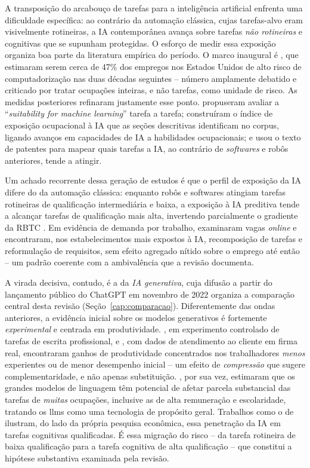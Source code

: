 A transposição do arcabouço de tarefas para a inteligência artificial enfrenta uma dificuldade específica: ao contrário da automação clássica, cujas tarefas-alvo eram visivelmente rotineiras, a IA contemporânea avança sobre tarefas \emph{não rotineiras} e cognitivas que se supunham protegidas. O esforço de medir essa exposição organiza boa parte da literatura empírica do período. O marco inaugural é \textcite{frey2017}, que estimaram serem cerca de 47\% dos empregos nos Estados Unidos de alto risco de computadorização nas duas décadas seguintes -- número amplamente debatido e criticado por tratar ocupações inteiras, e não tarefas, como unidade de risco. As medidas posteriores refinaram justamente esse ponto. \textcite{brynjolfssonMitchellRock2018} propuseram avaliar a ``\textit{suitability for machine learning}'' tarefa a tarefa; \textcite{felten2018, felten2021} construíram o índice de exposição ocupacional à IA que as seções descritivas identificam no corpus, ligando avanços em capacidades de IA a habilidades ocupacionais; e \textcite{webb2020} usou o texto de patentes para mapear quais tarefas a IA, ao contrário de \emph{softwares} e robôs anteriores, tende a atingir.

Um achado recorrente dessa geração de estudos é que o perfil de exposição da IA difere do da automação clássica: enquanto robôs e softwares atingiam tarefas rotineiras de qualificação intermediária e baixa, a exposição à IA preditiva tende a alcançar tarefas de qualificação mais alta, invertendo parcialmente o gradiente da RBTC \parencite{webb2020, felten2021}. Em evidência de demanda por trabalho, \textcite{acemogluVacancies2022} examinaram vagas \textit{online} e encontraram, nos estabelecimentos mais expostos à IA, recomposição de tarefas e reformulação de requisitos, sem efeito agregado nítido sobre o emprego até então -- um padrão coerente com a ambivalência que a revisão documenta.

A virada decisiva, contudo, é a da \emph{IA generativa}, cuja difusão a partir do lançamento público do ChatGPT em novembro de 2022 organiza a comparação central desta revisão (Seção~\ref{cap:comparacao}). Diferentemente das ondas anteriores, a evidência inicial sobre os modelos generativos é fortemente \emph{experimental} e centrada em produtividade. \textcite{noyZhang2023}, em experimento controlado de tarefas de escrita profissional, e \textcite{brynjolfssonLiRaymond2025}, com dados de atendimento ao cliente em firma real, encontraram ganhos de produtividade concentrados nos trabalhadores \emph{menos} experientes ou de menor desempenho inicial -- um efeito de \emph{compressão} que sugere complementaridade, e não apenas substituição. \textcite{eloundou2024}, por sua vez, estimaram que os grandes modelos de linguagem têm potencial de afetar parcela substancial das tarefas de \emph{muitas} ocupações, inclusive as de alta remuneração e escolaridade, tratando os \glspl{llm} como uma tecnologia de propósito geral. Trabalhos como o de \textcite{korinek2023} ilustram, do lado da própria pesquisa econômica, essa penetração da IA em tarefas cognitivas qualificadas. É essa migração do risco -- da tarefa rotineira de baixa qualificação para a tarefa cognitiva de alta qualificação -- que constitui a hipótese substantiva examinada pela revisão.

